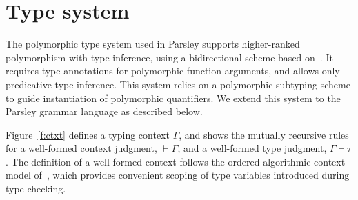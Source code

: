 \documentclass[letterpaper]{article}
\begin{document}
\section{Type system}
\label{s:typesys}

The polymorphic type system used in Parsley supports higher-ranked
polymorphism with type-inference, using a bidirectional scheme based
on~\cite{Dunfield13:bidir}.  It requires type annotations for
polymorphic function arguments, and allows only predicative type
inference.  This system relies on a polymorphic subtyping scheme
\cite{odersky96} to guide instantiation of polymorphic quantifiers.
We extend this system to the Parsley grammar language as described
below.

Figure~\ref{f:ctxt} defines a typing context $\Gamma$, and shows the
mutually recursive rules for a well-formed context judgment,
$\vdash\Gamma$, and a well-formed type judgment, $\Gamma\vdash\tau$.
The definition of a well-formed context follows the ordered
algorithmic context model
of~\cite{zhao2018,zhao19:bidir,Dunfield13:bidir}, which provides
convenient scoping of type variables introduced during type-checking.
\end{document}

